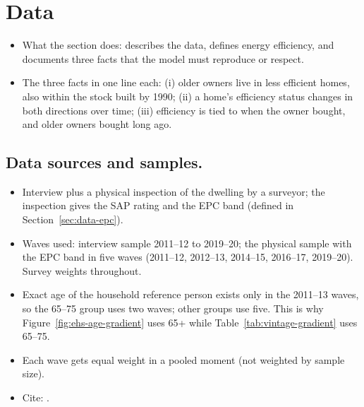 %
\section{Data}\label{sec:data}

\begin{itemize}
  \item What the section does: describes the data, defines energy efficiency,
    and documents three facts that the model must reproduce or respect.
  \item The three facts in one line each: (i) older owners live in less
    efficient homes, also within the stock built by 1990; (ii) a home's
    efficiency status changes in both directions over time; (iii) efficiency
    is tied to when the owner bought, and older owners bought long ago.
\end{itemize}

\subsection{Data sources and samples.}

\begin{itemize}
  \item Interview plus a physical inspection of the dwelling by a surveyor;
    the inspection gives the SAP rating and the EPC band (defined in
    Section~\ref{sec:data-epc}).
  \item Waves used: interview sample 2011--12 to 2019--20; the physical
    sample with the EPC band in five waves (2011--12, 2012--13, 2014--15,
    2016--17, 2019--20). Survey weights throughout.
  \item Exact age of the household reference person exists only in the
    2011--13 waves, so the 65--75 group uses two waves; other groups use
    five. This is why Figure~\ref{fig:ehs-age-gradient} uses 65+ while
    Table~\ref{tab:vintage-gradient} uses 65--75.
  \item Each wave gets equal weight in a pooled moment (not weighted by
    sample size).
  \item Cite: .
\end{itemize}

